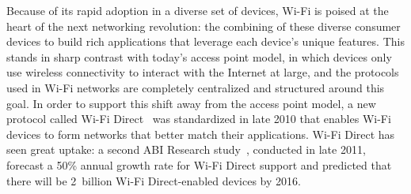 Because of its rapid adoption in a diverse set of devices, Wi-Fi is poised at the heart of the next networking revolution: the combining of these diverse consumer devices to build rich applications that leverage each device's unique features. This stands in sharp contrast with today's access point model, in which devices only use wireless connectivity to interact with the Internet at large, and the protocols used in Wi-Fi networks are completely centralized and structured around this goal. In order to support this shift away from the access point model, a new protocol called Wi-Fi Direct~\cite{wifi_direct} was standardized in late 2010 that enables Wi-Fi devices to form networks that better match their applications. Wi-Fi Direct has seen great uptake: a second ABI Research study~\cite{ABI_Research_2011}, conducted in late 2011, forecast a 50\% annual growth rate for Wi-Fi Direct support and predicted that there will be 2~billion Wi-Fi Direct-enabled devices by 2016.

%

